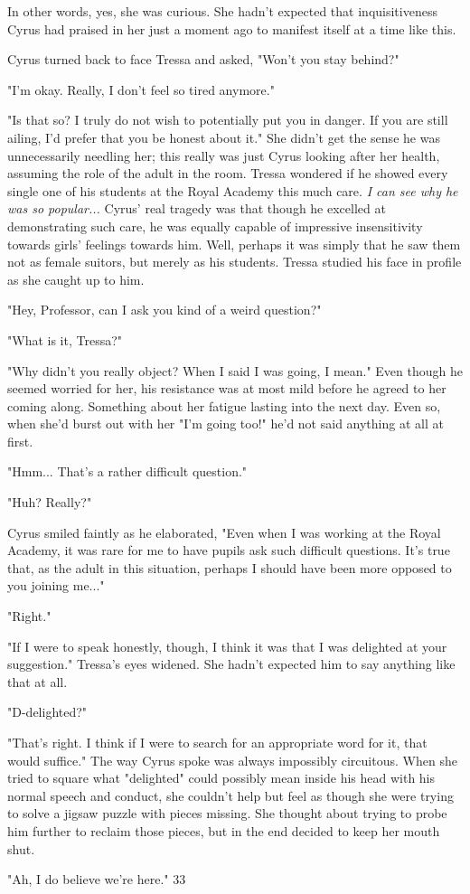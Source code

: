 In other words, yes, she was curious. She hadn't expected that inquisitiveness Cyrus had praised in her just a moment ago to manifest itself at a time like this.

Cyrus turned back to face Tressa and asked, "Won't you stay behind?"

"I'm okay. Really, I don't feel so tired anymore."

"Is that so? I truly do not wish to potentially put you in danger. If you are still ailing, I'd prefer that you be honest about it." She didn't get the sense he was unnecessarily needling her; this really was just Cyrus looking after her health, assuming the role of the adult in the room. Tressa wondered if he showed every single one of his students at the Royal Academy this much care. \emph{I can see why he was so popular...} Cyrus' real tragedy was that though he excelled at demonstrating such care, he was equally capable of impressive insensitivity towards girls' feelings towards him. Well, perhaps it was simply that he saw them not as female suitors, but merely as his students. Tressa studied his face in profile as she caught up to him.

"Hey, Professor, can I ask you kind of a weird question?"

"What is it, Tressa?"

"Why didn't you really object? When I said I was going, I mean." Even though he seemed worried for her, his resistance was at most mild before he agreed to her coming along. Something about her fatigue lasting into the next day. Even so, when she'd burst out with her "I'm going too!" he'd not said anything at all at first.

"Hmm... That's a rather difficult question."

"Huh? Really?"

Cyrus smiled faintly as he elaborated, "Even when I was working at the Royal Academy, it was rare for me to have pupils ask such difficult questions. It's true that, as the adult in this situation, perhaps I should have been more opposed to you joining me..."

"Right."

"If I were to speak honestly, though, I think it was that I was delighted at your suggestion." Tressa's eyes widened. She hadn't expected him to say anything like that at all.

"D-delighted?"

"That's right. I think if I were to search for an appropriate word for it, that would suffice." The way Cyrus spoke was always impossibly circuitous. When she tried to square what "delighted" could possibly mean inside his head with his normal speech and conduct, she couldn't help but feel as though she were trying to solve a jigsaw puzzle with pieces missing. She thought about trying to probe him further to reclaim those pieces, but in the end decided to keep her mouth shut.
\newline

"Ah, I do believe we're here." 33